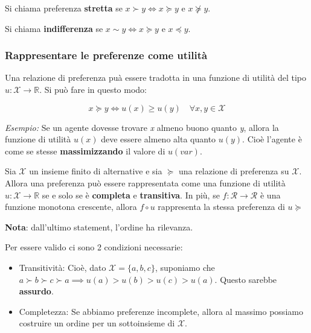Si chiama preferenza \textbf{stretta} se $x \succ y \iff x \succcurlyeq y$ e $x
    \nsucceq y$.

Si chiama \textbf{indifferenza} se $x \sim y \iff x \succcurlyeq y$ e $x
    \preccurlyeq y$.

\subsubsection{Rappresentare le preferenze come \textbf{utilità}}

Una relazione di preferenza puà essere tradotta in una funzione di utilità del
tipo $u: \mathcal{X} \rightarrow \mathbb{R}$. Si può fare in questo modo:

\begin{equation}
    x \succcurlyeq y \iff u(x) \geq u(y) \quad \forall x,y \in \mathcal{X}
\end{equation}

\textit{Esempio:} Se un agente dovesse trovare \textit{x} almeno buono quanto \textit{y}, allora la funzione di utilità $u(x)$ deve essere almeno
alta quanto $u(y)$. Cioè l'agente è come se stesse \textbf{massimizzando} il valore di $u(var)$.

\begin{theorem}

    Sia $\mathcal{X}$ un insieme finito di alternative e sia $\succcurlyeq$ una
    relazione di preferenza su $\mathcal{X}$. Allora una preferenza può essere
    rappresentata come una funzione di utilità $u: \mathcal{X} \rightarrow
        \mathbb{R}$ se e solo se è \textbf{completa} e \textbf{transitiva}. In più, se
    $f:\mathcal{R} \rightarrow \mathcal{R}$ è una funzione monotona crescente,
    allora $f \circ u$ rappresenta la stessa preferenza di $u \succcurlyeq$

    \textbf{Nota}: dall'ultimo statement, l'ordine ha rilevanza.

    Per essere valido ci sono 2 condizioni necessarie:
    \begin{itemize}
        \item Transitività: Cioè, dato $\mathcal{X} = \{a,b,c\}$, suponiamo che $a \succ b
                  \succ c \succ a \implies u(a) > u(b) > u(c) > u(a)$. Questo sarebbe
              \textbf{assurdo}.
        \item Completezza: Se abbiamo preferenze incomplete, allora al massimo possiamo
              costruire un ordine per un sottoinsieme di $\mathcal{X}$.
    \end{itemize}
\end{theorem}

